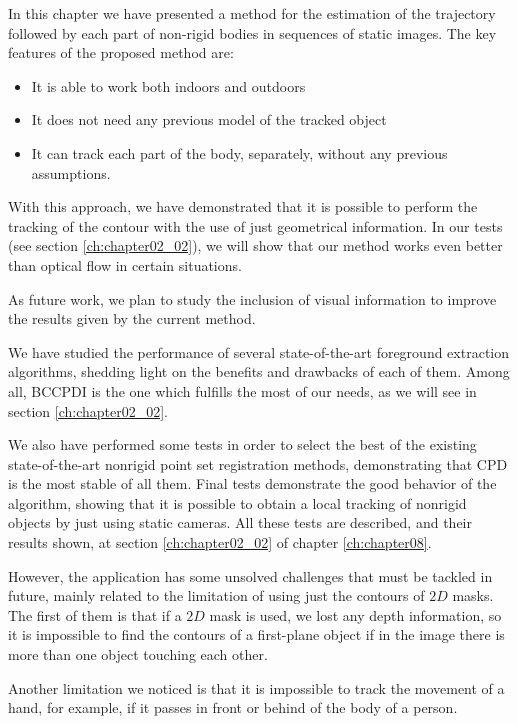 In this chapter we have presented a method for the estimation of the trajectory followed by each part of non-rigid bodies in sequences of static images. The key features of the proposed method are:
\begin{itemize}
 \item It is able to work both indoors and outdoors
 \item It does not need any previous model of the tracked object
 \item It can track each part of the body, separately, without any previous assumptions.
\end{itemize}

With this approach, we have demonstrated that it is possible to perform the tracking of the contour with the use of just geometrical information. In our tests (see section \ref{ch:chapter02_02}), we will show that our method works even better than optical flow in certain situations. 

As future work, we plan to study the inclusion of visual information to improve the results given by the current method.

We have studied the performance of several state-of-the-art foreground extraction algorithms, shedding light on the 
benefits and drawbacks of each of them. Among all, BCCPDI is the one which fulfills the most of our needs, as we will see in section \ref{ch:chapter02_02}. 

We also have performed some tests in order to select the best of the existing state-of-the-art nonrigid point set registration methods, demonstrating that \ac{CPD} is the most stable of all them. Final tests demonstrate the good behavior of the algorithm, showing that it is possible to obtain a local tracking of nonrigid objects by just using static cameras. All these tests are described, and their results shown, at section \ref{ch:chapter02_02} of chapter \ref{ch:chapter08}.

However, the application has some unsolved challenges that must be tackled in future, mainly related to the 
limitation of using just the contours of $2D$ masks. The first of them is that if a  $2D$ mask is used, we lost any 
depth information, so it is impossible to find the contours of a first-plane object if in the image there is more than 
one object touching each other. 

Another limitation we noticed is that it is impossible to track the movement of a hand, for example, if it 
passes in front or behind of the body of a person. 

